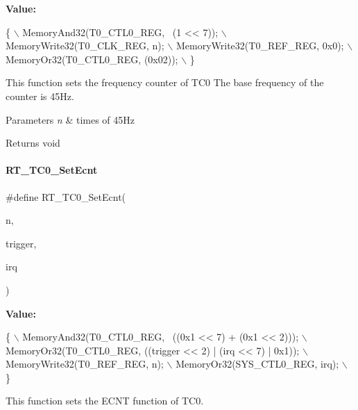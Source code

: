 {\bfseries Value\+:}
\begin{DoxyCode}
\{                                        \(\backslash\)
        MemoryAnd32(T0\_CTL0\_REG, ~(1 << 7)); \(\backslash\)
        MemoryWrite32(T0\_CLK\_REG, n);        \(\backslash\)
        MemoryWrite32(T0\_REF\_REG, 0x0);      \(\backslash\)
        MemoryOr32(T0\_CTL0\_REG, (0x02));     \(\backslash\)
    \}
\end{DoxyCode}


This function sets the frequency counter of T\+C0 The base frequency of the counter is 45\+Hz. 


\begin{DoxyParams}{Parameters}
{\em n} & times of 45\+Hz \\
\hline
\end{DoxyParams}
\begin{DoxyReturn}{Returns}
void 
\end{DoxyReturn}
\mbox{\label{a00041_a2739dbdedbc45242d873c9ecd9f5f56a}} 
\paragraph{\texorpdfstring{R\+T\+\_\+\+T\+C0\+\_\+\+Set\+Ecnt}{RT\_TC0\_SetEcnt}}
{\footnotesize\ttfamily \#define R\+T\+\_\+\+T\+C0\+\_\+\+Set\+Ecnt(\begin{DoxyParamCaption}\item[{}]{n,  }\item[{}]{trigger,  }\item[{}]{irq }\end{DoxyParamCaption})}

{\bfseries Value\+:}
\begin{DoxyCode}
\{                                                                 \(\backslash\)
        MemoryAnd32(T0\_CTL0\_REG, ~((0x1 << 7) + (0x1 << 2)));         \(\backslash\)
        MemoryOr32(T0\_CTL0\_REG, ((trigger << 2) | (irq << 7) | 0x1)); \(\backslash\)
        MemoryWrite32(T0\_REF\_REG, n);                                 \(\backslash\)
        MemoryOr32(SYS\_CTL0\_REG, irq);                                \(\backslash\)
    \}
\end{DoxyCode}


This function sets the E\+C\+NT function of T\+C0. 


